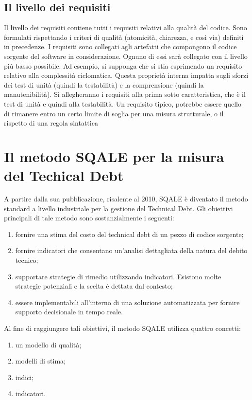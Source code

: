 \subsection{Il livello dei requisiti}
Il livello dei requisiti contiene tutti i requisiti relativi alla qualità del codice. Sono formulati rispettando i
criteri di qualità (atomicità, chiarezza, e così via) definiti in precedenze.
I requisiti sono collegati agli artefatti che compongono il codice sorgente del software in considerazione.
Ognuno di essi sarà collegato con il livello più basso possibile. Ad esempio, si supponga che si stia
esprimendo un requisito relativo alla complessità ciclomatica. Questa proprietà interna impatta sugli sforzi
dei test di unità (quindi la testabilità) e la comprensione (quindi la manutenibilità). Si allegheranno i requisiti
alla prima sotto caratteristica, che è il test di unità e quindi alla testabilità. Un requisito tipico, potrebbe
essere quello di rimanere entro un certo limite di soglia per una misura strutturale, o il rispetto di una regola
sintattica
\section{Il metodo SQALE per la misura del Techical Debt}
A partire dalla sua pubblicazione, risalente al 2010, SQALE è diventato il metodo standard a livello industriale per la gestione del Technical Debt. Gli obiettivi principali di tale metodo sono sostanzialmente i seguenti:
\begin{enumerate}
	\item fornire una stima del costo del technical debt di un pezzo di codice sorgente;
	\item fornire indicatori che consentano un'analisi  dettagliata della natura del debito tecnico;
	\item supportare strategie di rimedio utilizzando indicatori. Esistono molte strategie potenziali e la scelta è dettata dal contesto;
	\item essere implementabili all'interno di una soluzione automatizzata per fornire supporto decisionale in tempo reale.
\end{enumerate}
Al fine di raggiungere tali obiettivi, il metodo SQALE utilizza quattro concetti:
\begin{enumerate}
	\item un modello di qualità;
	\item modelli di stima;
	\item indici;
	\item indicatori.
\end{enumerate}
